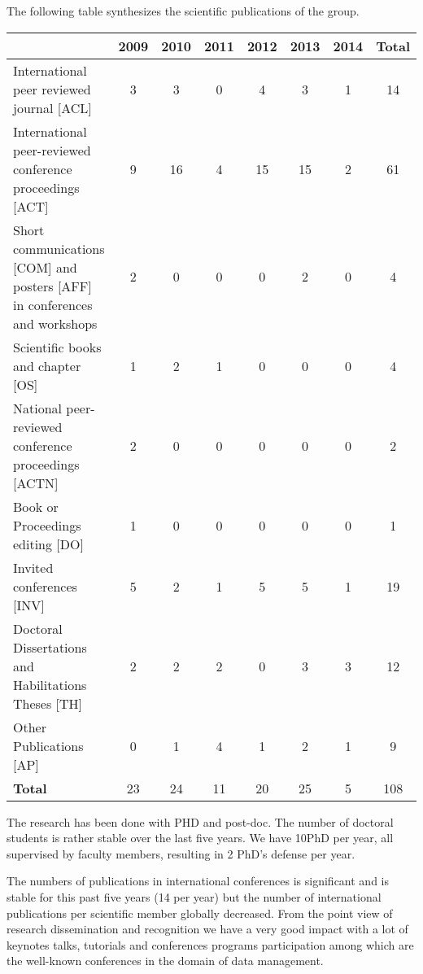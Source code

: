 



The following table synthesizes the scientific publications of the group.
\begin{center}\begin{tabular}{|p{6cm}|*{7}{c|}}
\hline
~ &2009 &2010 &2011 &2012 &2013 &2014 & \textbf{Total} \\
\hline
International peer reviewed journal [ACL] & 3  & 3  & 0  & 4  & 3  & 1  & 14 \\
\hline
International peer-reviewed conference proceedings [ACT] & 9  & 16  & 4  & 15  & 15  & 2  & 61 \\
\hline
Short communications [COM] and posters [AFF] in conferences and workshops & 2  & 0  & 0  & 0  & 2  & 0  & 4 \\
\hline
Scientific books and chapter [OS] & 1  & 2  & 1  & 0  & 0  & 0  & 4 \\
\hline
National peer-reviewed conference proceedings [ACTN] & 2  & 0  & 0  & 0  & 0  & 0  & 2 \\
\hline
Book or Proceedings editing [DO] & 1  & 0  & 0  & 0  & 0  & 0  & 1 \\
\hline
Invited conferences [INV] & 5  & 2  & 1  & 5  & 5  & 1  & 19 \\
\hline
Doctoral Dissertations and Habilitations Theses [TH] & 2  & 2  & 2  & 0  & 3  & 3  & 12 \\
\hline
Other Publications [AP] & 0  & 1  & 4  & 1  & 2  & 1  & 9 \\
\hline \textbf{Total} &23&24&11&20&25&5 &108\\
\hline
\end{tabular}\end{center}
\makeatother


The research has been done with PHD and post-doc. The  number of doctoral students is rather stable over the last five years. We have 10PhD per year, all supervised by faculty members, resulting in 2 PhD's defense per year. 

The numbers of publications in international conferences is significant and is stable for this past five years (14 per year) but the number of international publications per scientific member globally decreased. 
From the point view of research dissemination and recognition we have a very good impact with a lot of keynotes talks, tutorials and conferences
programs participation among which are the well-known conferences in the domain of data management. 

